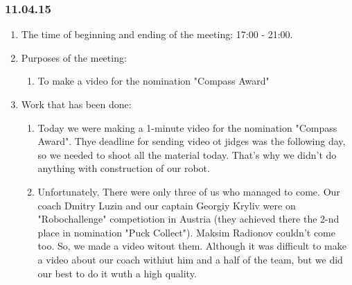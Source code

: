\subsubsection{11.04.15}
\begin{enumerate}
	
	\item The time of beginning and ending of the meeting: 17:00 - 21:00.
	
	\item Purposes of the meeting: 
	\begin{enumerate}
		
		\item To make a video for the nomination "Compass Award"
		
	\end{enumerate}

	\item Work that has been done:
	\begin{enumerate}
		
		\item Today we were making a 1-minute video for the nomination "Compass Award". Thye deadline for sending video ot jidges was the following day, so we needed to shoot all the material today. That's why we didn't do anything with construction of our robot.
		
		\item Unfortunately, There were only three of us who managed to come. Our coach Dmitry Luzin and our captain Georgiy Kryliv were on "Robochallenge" competiotion in Austria (they achieved there the 2-nd place in nomination "Puck Collect"). Maksim Radionov couldn't come too. So, we made a video witout them. Although it was difficult to make a video about our coach withiut him and a half of the team, but we did our best to do it wuth a high quality.
        \begin{figure}[H]
	  	  \begin{minipage}[h]{0.2\linewidth}
	  	    \center  
	  	  \end{minipage}
	  	  \begin{minipage}[h]{0.6\linewidth}
	  		\caption{}
	  	  \end{minipage}
	   \end{figure}


\end{enumerate}
\end{enumerate}
